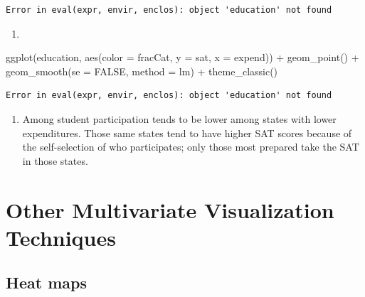 \documentclass[
  letterpaper,
  DIV=11,
  numbers=noendperiod]{scrreprt}
\newenvironment{Shaded}{\begin{snugshade}}{\end{snugshade}}
\newcommand{\AttributeTok}[1]{\textcolor[rgb]{0.40,0.45,0.13}{#1}}
\newcommand{\ConstantTok}[1]{\textcolor[rgb]{0.56,0.35,0.01}{#1}}
\newcommand{\FunctionTok}[1]{\textcolor[rgb]{0.28,0.35,0.67}{#1}}
\newcommand{\NormalTok}[1]{\textcolor[rgb]{0.00,0.23,0.31}{#1}}
\newcommand{\SpecialCharTok}[1]{\textcolor[rgb]{0.37,0.37,0.37}{#1}}
\newcommand{\StringTok}[1]{\textcolor[rgb]{0.13,0.47,0.30}{#1}}
\providecommand{\tightlist}{%
  \setlength{\itemsep}{0pt}\setlength{\parskip}{0pt}}\usepackage{longtable,booktabs,array}
\begin{document}
\begin{verbatim}
Error in eval(expr, envir, enclos): object 'education' not found
\end{verbatim}

\begin{enumerate}
\def\labelenumi{\alph{enumi}.}
\setcounter{enumi}{2}
\tightlist
\item
\end{enumerate}

\begin{Shaded}
\begin{Highlighting}[]
\FunctionTok{ggplot}\NormalTok{(education, }\FunctionTok{aes}\NormalTok{(}\AttributeTok{color =}\NormalTok{ fracCat, }\AttributeTok{y =}\NormalTok{ sat, }\AttributeTok{x =}\NormalTok{ expend)) }\SpecialCharTok{+}
  \FunctionTok{geom\_point}\NormalTok{() }\SpecialCharTok{+} \FunctionTok{geom\_smooth}\NormalTok{(}\AttributeTok{se =} \ConstantTok{FALSE}\NormalTok{, }\AttributeTok{method =} \StringTok{\textquotesingle{}lm\textquotesingle{}}\NormalTok{) }\SpecialCharTok{+} \FunctionTok{theme\_classic}\NormalTok{()}
\end{Highlighting}
\end{Shaded}

\begin{verbatim}
Error in eval(expr, envir, enclos): object 'education' not found
\end{verbatim}

\begin{enumerate}
\def\labelenumi{\alph{enumi}.}
\setcounter{enumi}{3}
\tightlist
\item
  Among student participation tends to be lower among states with lower
  expenditures. Those same states tend to have higher SAT scores because
  of the self-selection of who participates; only those most prepared
  take the SAT in those states.
\end{enumerate}

\hfill\break

\section*{Other Multivariate Visualization
Techniques}\label{other-multivariate-visualization-techniques}


\subsection*{Heat maps}\label{heat-maps}
\end{document}
